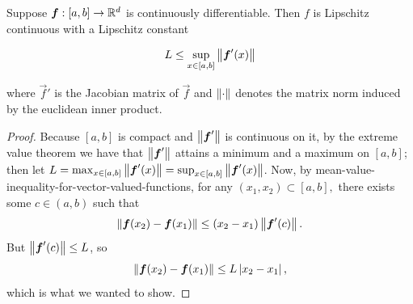 \documentclass{article}
\begin{document}
\begin{theorem}
	Suppose $\boldsymbol{f} : [a,b] \to \mathbb{R}^d$ is \@{continuously differentiable}. Then $f$ is \@{Lipschitz continuous} with a \@{Lipschitz constant}

	\[ L \leq \sup_{x \in [a,b]} \left\lVert \boldsymbol{f}'(x) \right\rVert \]

	where $\vec{f}'$ is the \@{Jacobian matrix} of $\vec{f}$ and $\left\lVert \cdot \right\rVert$ denotes the matrix \@{norm} induced by the \@{euclidean inner product}.
\end{theorem}
\begin{proof}
	Because $[a,b]$ is \@{compact} and $\left\lVert \boldsymbol{f}' \right\rVert$ is \@{continuous} on it, by the \@{extreme value theorem} we have that $\left\lVert \boldsymbol{f}' \right\rVert$ attains a minimum and a maximum on $[a,b]$; then let $L = \max_{x \in [a,b]} \left\lVert \boldsymbol{f}'(x) \right\rVert = \sup_{x \in [a,b]} \left\lVert \boldsymbol{f}'(x) \right\rVert$.
	Now, by \@{mean-value-inequality-for-vector-valued-functions}, for any $(x_1, x_2) \subset [a,b],$ there exists some $c \in (a,b)$ such that
	\[ \left\lVert \boldsymbol{f}(x_2) - \boldsymbol{f}(x_1) \right\rVert \leq (x_2 - x_1)\left\lVert \boldsymbol{f}'(c) \right\rVert. \]
	But $\left\lVert \boldsymbol{f}'(c) \right\rVert \leq L$, so
	\[ \left\lVert \boldsymbol{f}(x_2) - \boldsymbol{f}(x_1) \right\rVert \leq L \left| x_2 - x_1 \right|, \]
	which is what we wanted to show.
\end{proof}
\end{document}
